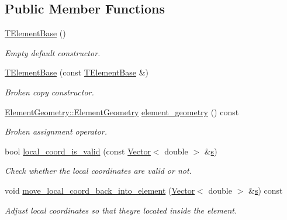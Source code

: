 \subsection*{Public Member Functions}
\begin{DoxyCompactItemize}
\item 
\hyperlink{classoomph_1_1TElementBase_a22cb91376d755b08c248acbc4f721422}{T\+Element\+Base} ()
\begin{DoxyCompactList}\small\item\em Empty default constructor. \end{DoxyCompactList}\item 
\hyperlink{classoomph_1_1TElementBase_a54043fafbe745fa7726f8c4132ea29f0}{T\+Element\+Base} (const \hyperlink{classoomph_1_1TElementBase}{T\+Element\+Base} \&)
\begin{DoxyCompactList}\small\item\em Broken copy constructor. \end{DoxyCompactList}\item 
\hyperlink{namespaceoomph_1_1ElementGeometry_a86ff99972b0205d7524e294c58c1182a}{Element\+Geometry\+::\+Element\+Geometry} \hyperlink{classoomph_1_1TElementBase_a2dc9fee159f9f682e195bd6ebfd5f1b6}{element\+\_\+geometry} () const
\begin{DoxyCompactList}\small\item\em Broken assignment operator. \end{DoxyCompactList}\item 
bool \hyperlink{classoomph_1_1TElementBase_aa13f1d631a3373f8981b748dd469ff8f}{local\+\_\+coord\+\_\+is\+\_\+valid} (const \hyperlink{classoomph_1_1Vector}{Vector}$<$ double $>$ \&\hyperlink{cfortran_8h_ab7123126e4885ef647dd9c6e3807a21c}{s})
\begin{DoxyCompactList}\small\item\em Check whether the local coordinates are valid or not. \end{DoxyCompactList}\item 
void \hyperlink{classoomph_1_1TElementBase_a0cce6b402f810f136ee04847727ca02a}{move\+\_\+local\+\_\+coord\+\_\+back\+\_\+into\+\_\+element} (\hyperlink{classoomph_1_1Vector}{Vector}$<$ double $>$ \&\hyperlink{cfortran_8h_ab7123126e4885ef647dd9c6e3807a21c}{s}) const
\begin{DoxyCompactList}\small\item\em Adjust local coordinates so that they\textquotesingle{}re located inside the element. \end{DoxyCompactList}\end{DoxyCompactItemize}
